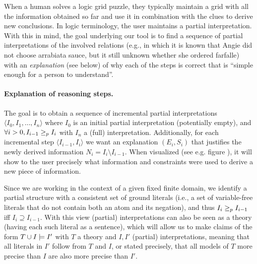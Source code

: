 
When a human solves a logic grid puzzle, they typically maintain a grid with all the information obtained so far and use it in combination with the clues to derive new conclusions. In logic terminology, the user maintains a partial interpretation.  
With this in mind, the goal underlying our tool is to find a sequence of partial interpretations of the involved relations (e.g., in which it is known that Angie did not choose arrabiata sauce, but it still unknown whether she ordered farfalle) with an 
\emph{explanation} (see below) of why each of the steps is correct that is ``simple enough for a person to understand''. 

\paragraph{Explanation of reasoning steps.}
The goal is to obtain a sequence of incremental partial interpretations $\langle I_0, I_1, \ldots, I_n \rangle$ where $I_0$ is an initial partial interpretation (potentially empty), and $\forall i>0, I_{i-1} \geq_p I_{i}$ with $I_n$ a (full) interpretation.
Additionally, for each incremental step $\langle I_{i-1}, I_i \rangle$ we want an explanation $(E_i,S_i)$ that justifies the newly derived information $N_i = I_i \setminus I_{i-1}$. When visualized (see e.g. figure ), it will show to the user precisely what information and constraints were used to derive a new piece of information.

Since we are working in the context of a given fixed finite domain, we identify a partial structure with a consistent set of ground literals (i.e., a set of variable-free literals that do not contain both an atom and its negation), and thus $I_i\geq_p I_{i-1}$ iff $I_i\supseteq I_{i-1}$.
With this view (partial) interpretations can also be seen as a theory (having each such literal as a sentence), which will allow us to make claims of the form 
$T\cup I \models I'$ with $T$ a theory and  $I,I'$ (partial) interpretations, meaning that all literals in $I'$ follow from $T$ and $I$, or stated precisely, that all models of $T$ more precise than $I$ are also more precise than $I'$. 

